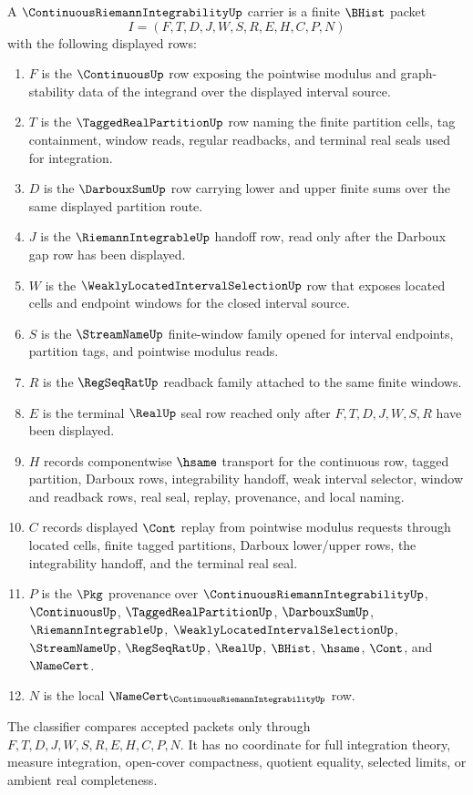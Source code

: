 \begin{definition}
\label{def:continuous-riemann-integrability-carrier}
A $\ContinuousRiemannIntegrabilityUp$ carrier is a finite $\BHist$ packet
$$
I=(F,T,D,J,W,S,R,E,H,C,P,N)
$$
with the following displayed rows:
\begin{enumerate}
\item $F$ is the $\ContinuousUp$ row exposing the pointwise modulus and graph-stability data of the integrand over the displayed interval source.
\item $T$ is the $\TaggedRealPartitionUp$ row naming the finite partition cells, tag containment, window reads, regular readbacks, and terminal real seals used for integration.
\item $D$ is the $\DarbouxSumUp$ row carrying lower and upper finite sums over the same displayed partition route.
\item $J$ is the $\RiemannIntegrableUp$ handoff row, read only after the Darboux gap row has been displayed.
\item $W$ is the $\WeaklyLocatedIntervalSelectionUp$ row that exposes located cells and endpoint windows for the closed interval source.
\item $S$ is the $\StreamNameUp$ finite-window family opened for interval endpoints, partition tags, and pointwise modulus reads.
\item $R$ is the $\RegSeqRatUp$ readback family attached to the same finite windows.
\item $E$ is the terminal $\RealUp$ seal row reached only after $F,T,D,J,W,S,R$ have been displayed.
\item $H$ records componentwise $\hsame$ transport for the continuous row, tagged partition, Darboux rows, integrability handoff, weak interval selector, window and readback rows, real seal, replay, provenance, and local naming.
\item $C$ records displayed $\Cont$ replay from pointwise modulus requests through located cells, finite tagged partitions, Darboux lower/upper rows, the integrability handoff, and the terminal real seal.
\item $P$ is the $\Pkg$ provenance over $\ContinuousRiemannIntegrabilityUp$, $\ContinuousUp$, $\TaggedRealPartitionUp$, $\DarbouxSumUp$, $\RiemannIntegrableUp$, $\WeaklyLocatedIntervalSelectionUp$, $\StreamNameUp$, $\RegSeqRatUp$, $\RealUp$, $\BHist$, $\hsame$, $\Cont$, and $\NameCert$.
\item $N$ is the local $\NameCert_{\ContinuousRiemannIntegrabilityUp}$ row.
\end{enumerate}
The classifier compares accepted packets only through $F,T,D,J,W,S,R,E,H,C,P,N$. It has no coordinate for full integration theory, measure integration, open-cover compactness, quotient equality, selected limits, or ambient real completeness.
\end{definition}

